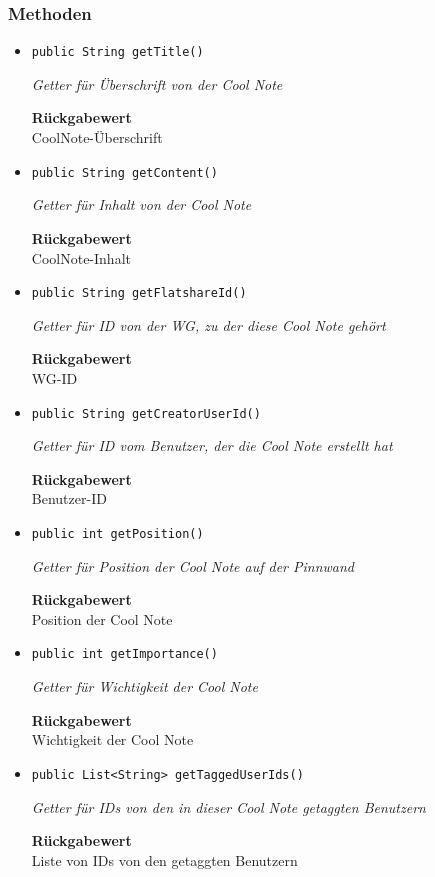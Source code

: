     \subsubsection{Methoden}
    \begin{itemize}
    	\item{\texttt{public String getTitle()}}
    	
    	\textit{Getter für Überschrift von der Cool Note}
    	
    	
    	
    	\textbf{Rückgabewert} \\
    	CoolNote-Überschrift        \item{\texttt{public String getContent()}}
    	
    	\textit{Getter für Inhalt von der Cool Note}
    	
    	
    	
    	\textbf{Rückgabewert} \\
    	CoolNote-Inhalt        \item{\texttt{public String getFlatshareId()}}
    	
    	\textit{Getter für ID von der WG, zu der diese Cool Note gehört}
    	
    	
    	
    	\textbf{Rückgabewert} \\
    	WG-ID        \item{\texttt{public String getCreatorUserId()}}
    	
    	\textit{Getter für ID vom Benutzer, der die Cool Note erstellt hat}
    	
    	
    	
    	\textbf{Rückgabewert} \\
    	Benutzer-ID        \item{\texttt{public int getPosition()}}
    	
    	\textit{Getter für Position der Cool Note auf der Pinnwand}
    	
    	
    	
    	\textbf{Rückgabewert} \\
    	Position der Cool Note        \item{\texttt{public int getImportance()}}
    	
    	\textit{Getter für Wichtigkeit der Cool Note}
    	
    	
    	
    	\textbf{Rückgabewert} \\
    	Wichtigkeit der Cool Note        \item{\texttt{public List<String> getTaggedUserIds()}}
    	
    	\textit{Getter für IDs von den in dieser Cool Note getaggten Benutzern}
    	
    	
    	
    	\textbf{Rückgabewert} \\
    	Liste von IDs von den getaggten Benutzern
    \end{itemize}
